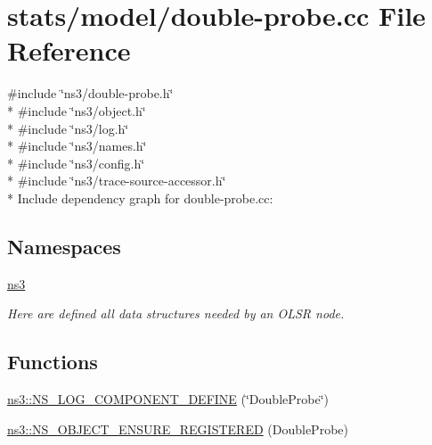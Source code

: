 \hypertarget{double-probe_8cc}{}\section{stats/model/double-\/probe.cc File Reference}
\label{double-probe_8cc}
{\ttfamily \#include \char`\"{}ns3/double-\/probe.\+h\char`\"{}}\\*
{\ttfamily \#include \char`\"{}ns3/object.\+h\char`\"{}}\\*
{\ttfamily \#include \char`\"{}ns3/log.\+h\char`\"{}}\\*
{\ttfamily \#include \char`\"{}ns3/names.\+h\char`\"{}}\\*
{\ttfamily \#include \char`\"{}ns3/config.\+h\char`\"{}}\\*
{\ttfamily \#include \char`\"{}ns3/trace-\/source-\/accessor.\+h\char`\"{}}\\*
Include dependency graph for double-\/probe.cc\+:
\subsection*{Namespaces}
\begin{DoxyCompactItemize}
\item 
 \hyperlink{namespacens3}{ns3}
\begin{DoxyCompactList}\small\item\em Here are defined all data structures needed by an O\+L\+SR node. \end{DoxyCompactList}\end{DoxyCompactItemize}
\subsection*{Functions}
\begin{DoxyCompactItemize}
\item 
\hyperlink{namespacens3_a04811077b24d9b220cfb2dcc1e22a20f}{ns3\+::\+N\+S\+\_\+\+L\+O\+G\+\_\+\+C\+O\+M\+P\+O\+N\+E\+N\+T\+\_\+\+D\+E\+F\+I\+NE} (\char`\"{}Double\+Probe\char`\"{})
\item 
\hyperlink{namespacens3_a5354f4e39884da14fa3e39842887d6ad}{ns3\+::\+N\+S\+\_\+\+O\+B\+J\+E\+C\+T\+\_\+\+E\+N\+S\+U\+R\+E\+\_\+\+R\+E\+G\+I\+S\+T\+E\+R\+ED} (Double\+Probe)
\end{DoxyCompactItemize}
